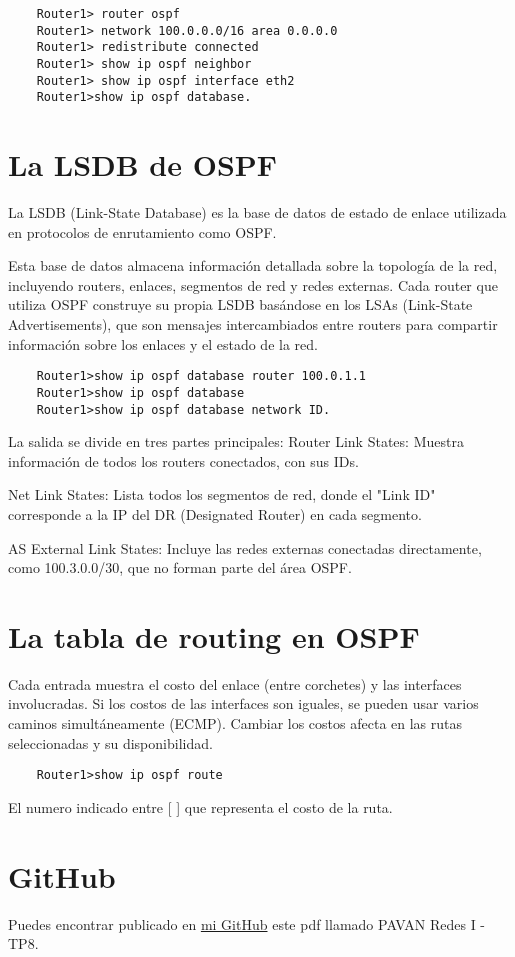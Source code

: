 \documentclass{article}
\begin{document}
\begin{lstlisting}
    Router1> router ospf
    Router1> network 100.0.0.0/16 area 0.0.0.0
    Router1> redistribute connected
    Router1> show ip ospf neighbor
    Router1> show ip ospf interface eth2
    Router1>show ip ospf database.
\end{lstlisting}


\section{La LSDB de OSPF}

La LSDB (Link-State Database) es la base de datos de estado de enlace utilizada en protocolos de enrutamiento como OSPF.

Esta base de datos almacena información detallada sobre la topología de la red, incluyendo routers, enlaces, segmentos de red y redes externas. Cada router que utiliza OSPF construye su propia LSDB basándose en los LSAs (Link-State Advertisements), que son mensajes intercambiados entre routers para compartir información sobre los enlaces y el estado de la red.

\begin{lstlisting}
    Router1>show ip ospf database router 100.0.1.1 
    Router1>show ip ospf database
    Router1>show ip ospf database network ID.
\end{lstlisting}

La salida se divide en tres partes principales:
Router Link States: Muestra información de todos los routers conectados, con sus IDs.

Net Link States: Lista todos los segmentos de red, donde el "Link ID" corresponde a la IP del DR (Designated Router) en cada segmento.

AS External Link States: Incluye las redes externas conectadas directamente, como 100.3.0.0/30, que no forman parte del área OSPF.

\section{La tabla de routing en OSPF}

Cada entrada muestra el costo del enlace (entre corchetes) y las interfaces involucradas. Si los costos de las interfaces son iguales, se pueden usar varios caminos simultáneamente (ECMP). Cambiar los costos afecta en las rutas seleccionadas y su disponibilidad.

\begin{lstlisting}
    Router1>show ip ospf route
\end{lstlisting}

El numero indicado entre [ ] que representa el costo de la ruta.

\section{GitHub}
Puedes encontrar publicado en \href{https://github.com/martinpavan1/redes1}{mi GitHub} este pdf llamado PAVAN Redes I - TP8.
\end{document}

